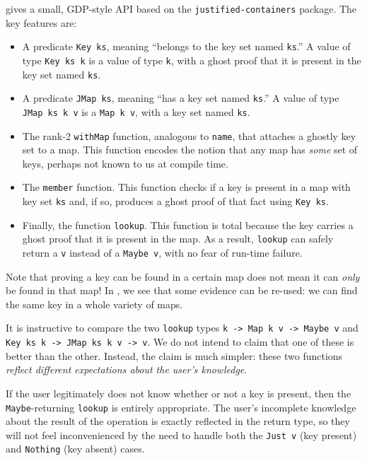 \documentclass[format=sigplan, review=false, screen=true, 10pt]{acmart}
\makeatletter
\let\origsubsection\subsection
\renewcommand\subsection{\@ifstar{\starsubsection}{\nostarsubsection}}
\newcommand\nostarsubsection[1]
{\subsectionprelude\origsubsection{#1}\subsectionpostlude}
\newcommand\starsubsection[1]
{\subsectionprelude\origsubsection*{#1}\subsectionpostlude}
\newcommand\subsectionprelude{%
  \vspace{-0.25em}
}
\newcommand\subsectionpostlude{%
  \vspace{-0.05em}
}
\makeatother
\begin{document}
 gives a small, GDP-style API based on the \texttt{justified-containers}
package. The key features are:
\begin{itemize}
\item A predicate \texttt{Key ks}, meaning ``belongs to the key set named \texttt{ks}.''
  A value of type \texttt{Key ks k} is a value of type \texttt{k}, with a ghost proof
  that it is present in the key set named \texttt{ks}.
\item A predicate \texttt{JMap ks}, meaning ``has a key set named \texttt{ks}.'' A value
  of type \texttt{JMap ks k v} is a \texttt{Map k v}, with a key set named \texttt{ks}.
\item The rank-2 \texttt{withMap} function, analogous to \texttt{name}, that attaches
  a ghostly key set to a map. This function encodes the notion that any map has
  \emph{some} set of keys, perhaps not known to us at compile time.
\item The \texttt{member} function. This function checks if a key is present in a map
  with key set \texttt{ks} and,
  if so, produces a ghost proof of that fact using \texttt{Key ks}.
\item Finally, the function \texttt{lookup}. This function is total because the
  key carries a ghost proof that it is present in the map. As a result, \texttt{lookup}
  can safely return
  a \texttt{v} instead of a \texttt{Maybe v}, with no fear of run-time failure.
\end{itemize}

Note that proving a key can be found in a certain map does not mean it can \emph{only}
be found in that map! In , we see that some evidence can be re-used:
we can find the same key in a whole variety of maps.

\subsection{Designing for the user's state of knowledge}
It is instructive to compare the two \texttt{lookup} types \texttt{k -> Map k v -> Maybe v}
and \texttt{Key ks k -> JMap ks k v -> v}. We do not intend to claim that
one of these is better than the other. Instead, the claim is much simpler: these two functions
\emph{reflect different expectations about the user's knowledge}.

If the user legitimately does not know whether or not a key is present, then the
\texttt{Maybe}-returning \texttt{lookup} is entirely appropriate. The user's incomplete knowledge
about the result of the operation is exactly reflected in the return type, so they will
not feel inconvenienced by the need to handle both the \texttt{Just v} (key present)
and \texttt{Nothing} (key absent) cases.
\end{document}
